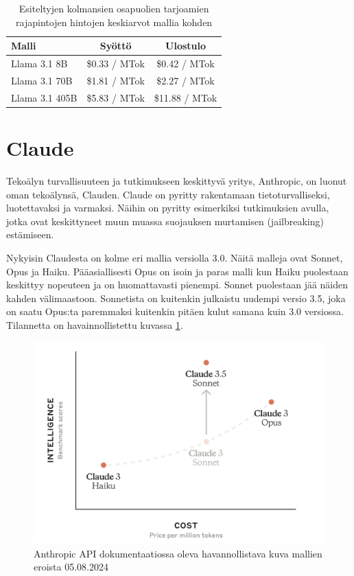 \begin{table}[H]
  \centering
  \caption{Esiteltyjen kolmansien osapuolien tarjoamien rajapintojen hintojen keskiarvot mallia kohden \parencite{llama}}
  \label{tab:third-party-llama-prices}
  \begin{tabular}{lcc}
    \textbf{Malli} & \textbf{Syöttö} & \textbf{Ulostulo} \\
    \hline
    Llama 3.1 8B   & \$0.33 / MTok &  \$0.42 / MTok \\
    Llama 3.1 70B  & \$1.81 / MTok &  \$2.27 / MTok \\
    Llama 3.1 405B & \$5.83 / MTok & \$11.88 / MTok \\
    \hline
  \end{tabular}
\end{table}

\section{Claude}

Tekoälyn turvallisuuteen ja tutkimukseen keskittyvä yritys, Anthropic, on
luonut oman tekoälynsä, Clauden. Claude on pyritty rakentamaan
tietoturvalliseksi, luotettavaksi ja varmaksi. \parencite{anthropicCompany}
\parencite{anthropicClaude} Näihin on pyritty esimerkiksi tutkimuksien avulla,
jotka ovat keskittyneet muun muassa suojauksen murtamisen (jailbreaking)
estämiseen. \parencite{anthropicResearch}

Nykyisin Claudesta on kolme eri mallia versiolla 3.0. Näitä malleja ovat
Sonnet, Opus ja Haiku. Pääasiallisesti Opus on isoin ja paras malli kun Haiku
puolestaan keskittyy nopeuteen ja on huomattavasti pienempi. Sonnet puolestaan
jää näiden kahden välimaastoon. Sonnetista on kuitenkin julkaistu uudempi
versio 3.5, joka on saatu Opus:ta paremmaksi kuitenkin pitäen kulut samana kuin
3.0 versiossa. Tilannetta on havainnollistettu kuvassa
\ref{fig:3-5-sonnet-curve}. \parencite{anthropicAPIDocsModels}

\begin{figure}[H]
  \includegraphics[width=\textwidth]{figures/3-5-sonnet-curve.png}
  \caption{Anthropic API dokumentaatiossa oleva havannollistava kuva mallien eroista 05.08.2024}
  \label{fig:3-5-sonnet-curve}
\end{figure}

